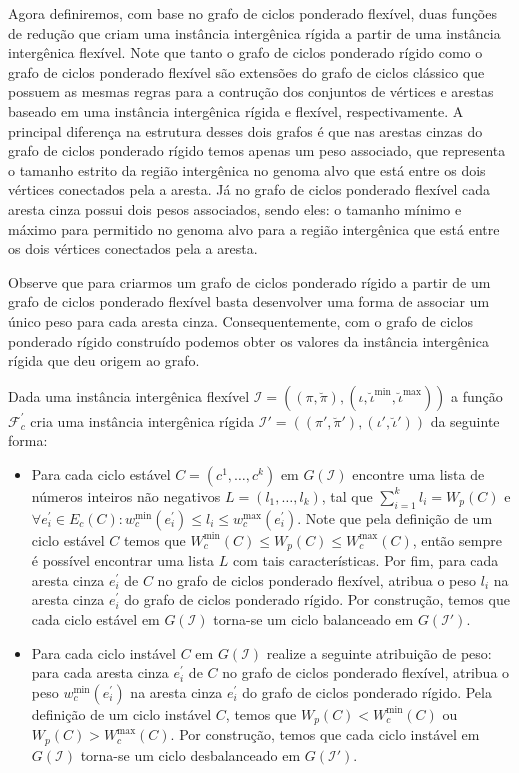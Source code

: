 Agora definiremos, com base no grafo de ciclos ponderado flexível, duas funções de redução que criam uma instância intergênica rígida a partir de uma instância intergênica flexível. Note que tanto o grafo de ciclos ponderado rígido como o grafo de ciclos ponderado flexível são extensões do grafo de ciclos clássico que possuem as mesmas regras para a contrução dos conjuntos de vértices e arestas baseado em uma instância intergênica rígida e flexível, respectivamente. A principal diferença na estrutura desses dois grafos é que nas arestas cinzas do grafo de ciclos ponderado rígido temos apenas um peso associado, que representa o tamanho estrito da região intergênica no genoma alvo que está entre os dois vértices conectados pela a aresta. Já no grafo de ciclos ponderado flexível cada aresta cinza possui dois pesos associados, sendo eles: o tamanho mínimo e máximo para permitido no genoma alvo para a região intergênica que está entre os dois vértices conectados pela a aresta. 

Observe que para criarmos um grafo de ciclos ponderado rígido a partir de um grafo de ciclos ponderado flexível basta desenvolver uma forma de associar um único peso para cada aresta cinza. Consequentemente, com o grafo de ciclos ponderado rígido construído podemos obter os valores da instância intergênica rígida que deu origem ao grafo.

Dada uma instância intergênica flexível $\mathcal{I} = ((\pi,\breve\pi),(\iota,\breve\iota^{\min},\breve\iota^{\max}))$ a função $\mathcal{F}_{c}^{'}$ cria uma instância intergênica rígida $\mathcal{I'} = ((\pi',\breve\pi'),(\iota',\breve\iota'))$ da seguinte forma:

\begin{itemize}
  \item Para cada ciclo estável $C=(c^1,\dots,c^k)$ em $G(\mathcal{I})$ encontre uma lista de números inteiros não negativos $L=(l_1,\dots,l_k)$, tal que $\sum_{i=1}^{k}l_i = W_p(C)$ e $\forall e^{\prime}_i \in E_c(C): w^{\min}_c(e^{\prime}_i) \le l_i \le w^{\max}_c(e^{\prime}_i)$. Note que pela definição de um ciclo estável $C$ temos que $W^{\min}_c(C) \le W_p(C) \le W^{\max}_c(C)$, então sempre é possível encontrar uma lista $L$ com tais características. Por fim, para cada aresta cinza $e^{\prime}_i$ de $C$ no grafo de ciclos ponderado flexível, atribua o peso $l_i$ na aresta cinza $e^{\prime}_i$ do grafo de ciclos ponderado rígido. Por construção, temos que cada ciclo estável em $G(\mathcal{I})$ torna-se um ciclo balanceado em $G(\mathcal{I}')$.
  \item Para cada ciclo instável $C$ em $G(\mathcal{I})$ realize a seguinte atribuição de peso: para cada aresta cinza $e^{\prime}_i$ de $C$ no grafo de ciclos ponderado flexível, atribua o peso $w^{\min}_c(e^{\prime}_i)$ na aresta cinza $e^{\prime}_i$ do grafo de ciclos ponderado rígido. Pela definição de um ciclo instável $C$, temos que $W_p(C)  < W^{\min}_c(C)$ ou $W_p(C) > W^{\max}_c(C)$. Por construção, temos que cada ciclo instável em $G(\mathcal{I})$ torna-se um ciclo desbalanceado em $G(\mathcal{I}')$.
\end{itemize}


